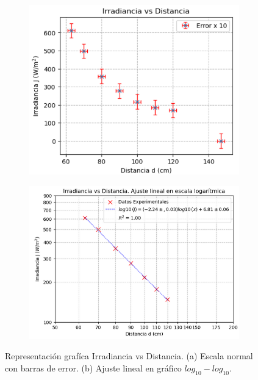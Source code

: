 \begin{figure}[H]
	\centering
	\begin{subfigure}{0.42\textwidth}
		\centering
		\includegraphics[width=\textwidth]{grafico01_irradiancia_vs_distancia.png}
		\caption{}\label{fig:a}
	\end{subfigure}\hspace{1cm} %
	\begin{subfigure}{0.51\textwidth}
		\centering
		\includegraphics[width=\textwidth]{grafico02_ajuste_loglog_irradiancia_vs_distancia.png}
		\caption{}\label{fig:b}
	\end{subfigure}
	\caption{Representación grafíca Irradiancia vs Distancia. (a) Escala normal con barras de error. (b) Ajuste lineal en gráfico $log_{10}-log_{10}$.}
	\label{fig:irradiancia_distancia}
\end{figure}

